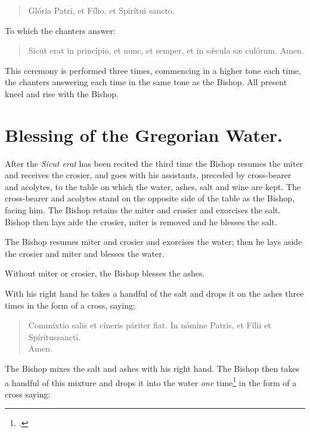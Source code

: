 \documentclass[letterpaper]{report}
\begin{document}
{    \begin{quote}
        \vbar Glória Patri, et Fílio, et Spirítui sancto.
    \end{quote}

    To which the chanters answer:

    \begin{quote}
        \rbar Sicut erat in princípio, et nunc, et semper, et in s\'\ae cula s\ae
        culórum. Amen.
    \end{quote}

    This ceremony is performed three times, commencing in a higher tone each
    time, the chanters answering each time in the same tone as the Bishop. All
    present kneel and rise with the Bishop. 

    \section{Blessing of the Gregorian Water.}

    \rubric After the \textit{Sicut erat} has been recited the third time the
    Bishop resumes the miter and receives the crosier, and goes with his
    assistants, preceded by cross-bearer and acolytes, to the table on which
    the water, ashes, salt and wine are kept. The cross-bearer and acolytes
    stand on the opposite side of the table as the Bishop, facing him. The
    Bishop retains the miter and crosier and exorcises the salt. Bishop then
    lays aide the crosier, miter is removed and he blesses the salt.

    \rubric The Bishop resumes miter and crosier and exorcises the water; then
    he lays aside the crosier and miter and blesses the water. 

    \rubric Without miter or crosier, the Bishop blesses the ashes.

    \rubric With his right hand he takes a handful of the salt and drops it on
    the ashes three times in the form of a cross, saying:

    \begin{quote}
       Commíxtio salis et cíneris páriter fiat. In nómine Pa\cross tris, et
        Fí\cross lii et Spíritus\cross sancti. \\
       \rbar Amen.
    \end{quote}

    The Bishop mixes the salt and ashes with his right hand. The Bishop then
    takes a handful of this mixture and drops it into the water \textit{one}
    time\footcite[The Pontifical seems to indicate that the bishop performs
    this ceremony \textit{three times,} but the authors imply that it is done
    only \textit{once.}][footnote 1, p. 60.]{consecranda} in the form of a
    cross saying:

}
\end{document}
